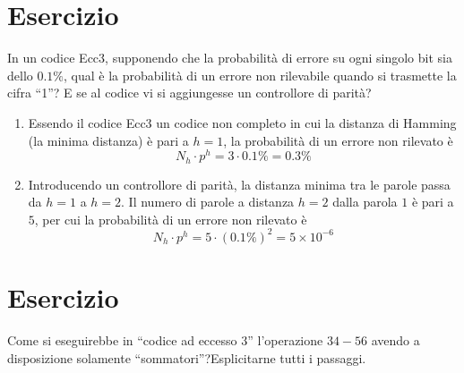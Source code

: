 \documentclass[a4paper]{extarticle}
\newcommand{\quotes}[1]{``#1''}
\begin{document}
\noindent
\section{Esercizio}
In un codice Ecc3, supponendo che la probabilità di errore su ogni singolo bit sia dello $0.1 \%$, qual è la probabilità di un errore non rilevabile quando si trasmette la cifra \quotes{1}? E se al codice vi si aggiungesse un controllore di parità?

\begin{enumerate}
    \item Essendo il codice Ecc3 un codice non completo in cui la distanza di Hamming (la minima distanza) è pari a $h=1$, la probabilità di un errore non rilevato è
    \[N_h \cdot p^h = 3 \cdot 0.1\% = 0.3\%\]

    \item Introducendo un controllore di parità, la distanza minima tra le parole passa da $h=1$ a $h=2$. Il numero di parole a distanza $h=2$ dalla parola $1$ è pari a $5$, per cui la probabilità di un errore non rilevato è
    \[N_h \cdot p^h = 5 \cdot (0.1\%)^2 = 5 \times 10^{-6}\]
\end{enumerate}

\noindent
\section{Esercizio}
Come si eseguirebbe in \quotes{codice ad eccesso $3$} l'operazione $34-56$ avendo a disposizione solamente \quotes{sommatori}?Esplicitarne tutti i passaggi.
\end{document}
